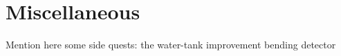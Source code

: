 \section{Miscellaneous}
\label{s:Miscellaneous}

Mention here some side quests:
the water-tank improvement
bending detector
